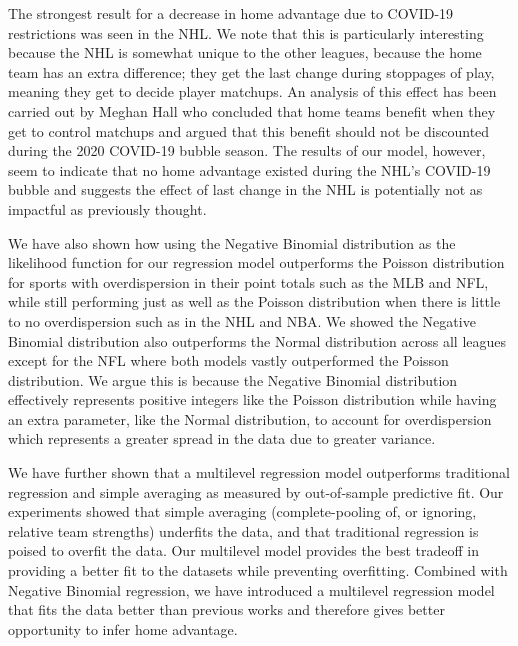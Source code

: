 The strongest result for a decrease in home advantage due to COVID-19 restrictions was seen in the NHL. We note that this is particularly interesting because the NHL is somewhat unique to the other leagues, because the home team has an extra difference; they get the last change during stoppages of play, meaning they get to decide player matchups. An analysis of this effect has been carried out by Meghan Hall \cite{Hall2020} who concluded that home teams benefit when they get to control matchups and argued that this benefit should not be discounted during the 2020 COVID-19 bubble season. The results of our model, however, seem to indicate that no home advantage existed during the NHL's COVID-19 bubble and suggests the effect of last change in the NHL is potentially not as impactful as previously thought.

We have also shown how using the Negative Binomial distribution as the likelihood function for our regression model outperforms the Poisson distribution for sports with overdispersion in their point totals such as the MLB and NFL, while still performing just as well as the Poisson distribution when there is little to no overdispersion such as in the NHL and NBA. We showed the Negative Binomial distribution also outperforms the Normal distribution across all leagues except for the NFL where both models vastly outperformed the Poisson distribution. We argue this is because the Negative Binomial distribution effectively represents positive integers like the Poisson distribution while having an extra parameter, like the Normal distribution, to account for overdispersion which represents a greater spread in the data due to greater variance.

We have further shown that a multilevel regression model outperforms traditional regression and simple averaging as measured by out-of-sample predictive fit. Our experiments showed that simple averaging (complete-pooling of, or ignoring, relative team strengths) underfits the data, and that traditional regression is poised to overfit the data. Our multilevel model provides the best tradeoff in providing a better fit to the datasets while preventing overfitting. Combined with Negative Binomial regression, we have introduced a multilevel regression model that fits the data better than previous works and therefore gives better opportunity to infer home advantage.

